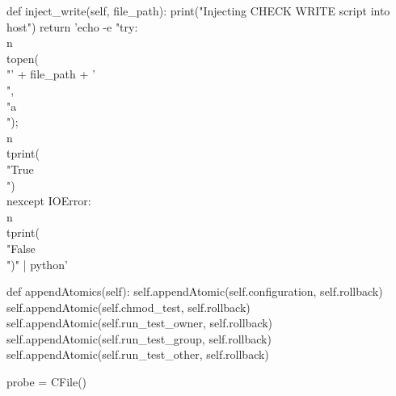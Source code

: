 \begin{python}
	def inject_write(self, file_path):
		print("Injecting CHECK WRITE script into host")
		return 'echo -e "try:\\n\\topen(\\"' + file_path + '\\",\\"a\\");\\n\\tprint(\\"True\\")\\nexcept IOError:\\n\\tprint(\\"False\\")" | python'


	def appendAtomics(self):
		self.appendAtomic(self.configuration, self.rollback)
		self.appendAtomic(self.chmod_test, self.rollback)
		self.appendAtomic(self.run_test_owner, self.rollback)
		self.appendAtomic(self.run_test_group, self.rollback)
		self.appendAtomic(self.run_test_other, self.rollback)


probe = CFile()
\end{python}
\label{app:confid}
